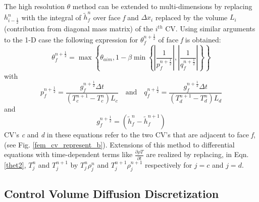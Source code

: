 The high resolution $\theta$ method can be extended to multi-dimensions by replacing $h_{i-\frac{1}{2}}^{n}$ with the integral of $\tilde{h}_{f}^{n}$ over face \textit{f} and $\Delta x_{i}$ replaced by the volume $L_{i}$ (contribution from diagonal mass matrix) of the $i^{th}$ CV. Using similar arguments to the 1-D case the following expression for $\theta_f^{n+\frac{1}{2}}$ of face \textit{f} is obtained:
\begin{equation}
\theta_f^{n+\frac{1}{2}}=\max \left\{ \theta_{aim}, 1 - \beta \min\left\{
\left|\frac{1}{p_{f}^{n+\frac{1}{2}}}\right|,\left|
\frac{1}{q_{f}^{n+\frac{1}{2}}} \right| \right\} \right\}
\label{thet1}
\end{equation}
with
\begin{equation}
p_f^{n+\frac{1}{2}} =
\frac{g_f^{n+\frac{1}{2}}\Delta t}{(T^{n+1}_{c} - T_{c}^{n}) L_{c}}
\quad \text{and} \quad q_f^{n+\frac{1}{2}} =
\frac{g_f^{n+\frac{1}{2}}\Delta t}{(T^{n+1}_{d} - T_{d}^{n}) L_{d}}
\label{thet2}
\end{equation}
and
\begin{equation}
g_f^{n+\frac{1}{2}}= (\tilde{h}_{f}^{n} - \tilde{h}_f^{n+1})
\label{gf}
\end{equation}
CV's \textit{c} and \textit{d} in these equations refer to the two CV's that are adjacent to face \textit{f}, (see Fig. \ref{fem_cv_represent_b}). Extensions of this method to differential equations with time-dependent terms like $\frac{\partial \rho T}{\partial t}$ are realized by replacing, in Eqn. \ref{thet2}, $T_j^n$ and $T_j^{n+1}$ by $T_{j}^{n} \rho_{j}^{n}$ and $T_{j}^{n+1} \rho_j^{n+1}$ respectively for $j = c$ and $j = d$.


\subsection{Control Volume Diffusion Discretization}\label{section_diff_discretisation}

